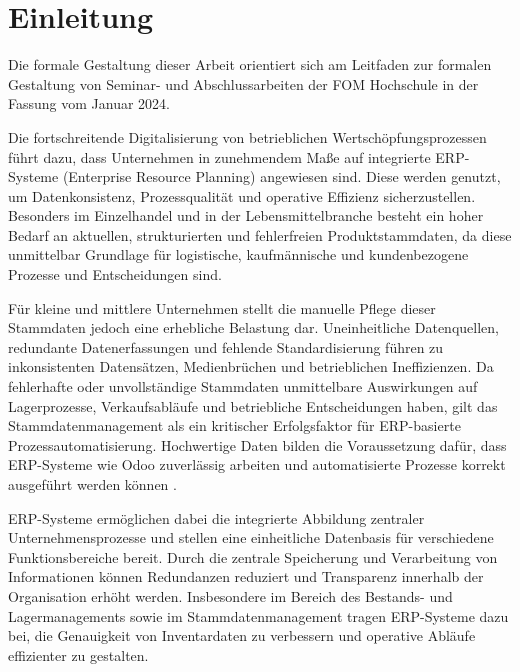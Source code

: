 \documentclass[12pt,a4paper]{article}
\begin{document}
\newpage
\hypersetup{pageanchor=true}
\setcounter{page}{1}

\section{Einleitung}

Die formale Gestaltung dieser Arbeit orientiert sich am Leitfaden zur formalen Gestaltung von Seminar- und Abschlussarbeiten der FOM Hochschule in der Fassung vom Januar 2024.

Die fortschreitende Digitalisierung von betrieblichen Wertschöpfungsprozessen führt dazu, dass Unternehmen in zunehmendem Maße auf integrierte ERP-Systeme (Enterprise Resource Planning) angewiesen sind. Diese werden genutzt, um Datenkonsistenz, Prozessqualität und operative Effizienz sicherzustellen. Besonders im Einzelhandel und in der Lebensmittelbranche besteht ein hoher Bedarf an aktuellen, strukturierten und fehlerfreien Produktstammdaten, da diese unmittelbar Grundlage für logistische, kaufmännische und kundenbezogene Prozesse und Entscheidungen sind. \autocite[Vgl.][]{krcmar2022}

Für kleine und mittlere Unternehmen stellt die manuelle Pflege dieser Stammdaten jedoch eine erhebliche Belastung dar. Uneinheitliche Datenquellen, redundante Datenerfassungen und fehlende Standardisierung führen zu inkonsistenten Datensätzen, Medienbrüchen und betrieblichen Ineffizienzen. \autocite[Vgl.][]{gronau2017} Da fehlerhafte oder unvollständige Stammdaten unmittelbare Auswirkungen auf Lagerprozesse, Verkaufsabläufe und betriebliche Entscheidungen haben, gilt das Stammdatenmanagement als ein kritischer Erfolgsfaktor für ERP-basierte Prozessautomatisierung. Hochwertige Daten bilden die Voraussetzung dafür, dass ERP-Systeme wie Odoo zuverlässig arbeiten und automatisierte Prozesse korrekt ausgeführt werden können \autocite[Vgl.][]{lausen2020}.

ERP-Systeme ermöglichen dabei die integrierte Abbildung zentraler Unternehmensprozesse und stellen eine einheitliche Datenbasis für verschiedene Funktionsbereiche bereit. Durch die zentrale Speicherung und Verarbeitung von Informationen können Redundanzen reduziert und Transparenz innerhalb der Organisation erhöht werden. \autocite[Vgl.][]{davenport1998} Insbesondere im Bereich des Bestands- und Lagermanagements sowie im Stammdatenmanagement tragen ERP-Systeme dazu bei, die Genauigkeit von Inventardaten zu verbessern und operative Abläufe effizienter zu gestalten. \autocite[Vgl.][]{romney2018}
\end{document}
